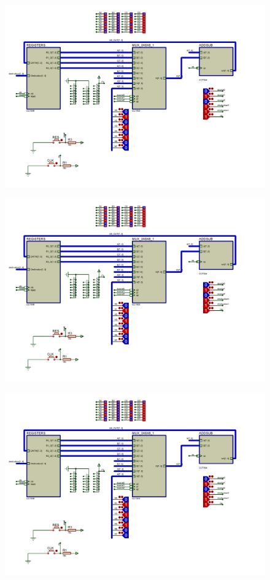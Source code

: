 \documentclass{article}
\begin{document}
\begin{figure}[H]
	\centering
	\includegraphics[scale=0.5,page=2]{graphics}
\end{figure}
\begin{figure}[H]
	\centering
	\includegraphics[scale=0.5,page=6]{graphics}
\end{figure}
\begin{figure}[H]
	\centering
	\includegraphics[scale=0.5,page=7]{graphics}
\end{figure}
\end{document}
